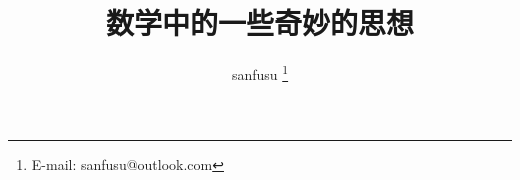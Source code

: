 \documentclass{ctexart}
\theoremstyle{definition} \newtheorem{question}{题}[section]
\theoremstyle{definition} \newtheorem{exposition}{述}[section]
\begin{document}
\title{数学中的一些奇妙的思想}
\author{sanfusu \thanks{E-mail: sanfusu@outlook.com}}
\maketitle



\end{document}

